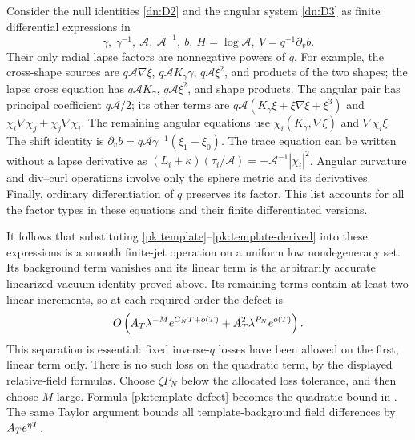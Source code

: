 Consider the null identities \eqref{dn:D2} and the angular system
\eqref{dn:D3} as finite differential expressions in
\[
 \gamma,\ \gamma^{-1},\ \mathcal A,\ \mathcal A^{-1},\ b,
 \ H=\log\mathcal A,\ V=q^{-1}\partial_vb.
\]
Their only radial lapse factors are nonnegative powers of $q$.
For example, the cross-shape sources are
$q\mathcal A\nabla\xi$, $q\mathcal A K_\gamma\gamma$,
$q\mathcal A\xi^2$, and products of the two shapes; the lapse
cross equation has $q\mathcal A K_\gamma$,
$q\mathcal A\xi^2$, and shape products. The angular pair has
principal coefficient $q\mathcal A/2$; its other terms are
$q\mathcal A(K_\gamma\xi+\xi\nabla\xi+\xi^3)$ and
$\chi_i\nabla\chi_j+\chi_j\nabla\chi_i$. The remaining angular
equations use $\chi_i(K_\gamma,\nabla\xi)$ and
$\nabla\chi_i\xi$. The shift identity is
$\partial_vb=q\mathcal A\gamma^{-1}(\xi_1-\xi_0)$.
The trace equation can be written without a lapse derivative as
$(L_i+\kappa)(\tau_i/\mathcal A)=-\mathcal A^{-1}|\chi_i|^2$.
Angular curvature and div--curl operations involve only the sphere
metric and its derivatives. Finally, ordinary differentiation of
$q$ preserves its factor. This list accounts for all the factor
types in these equations and their finite differentiated versions.

It follows that substituting \eqref{pk:template}--\eqref{pk:template-derived}
into these expressions is a smooth finite-jet operation on a
uniform low nondegeneracy set. Its background term vanishes and
its linear term is the arbitrarily accurate linearized vacuum
identity proved above. Its remaining terms contain at least two
linear increments, so at each required order the defect is
\begin{equation}\label{pk:template-defect}
 O\left(A_T\lambda^{-M}e^{C_NT+o(T)}
                   +A_T^2\lambda^{P_N}e^{o(T)}\right).
\end{equation}
This separation is essential: fixed inverse-$q$ losses have been
allowed on the first, linear term only. There is no such loss on
the quadratic term, by the displayed relative-field formulas.
Choose $\zeta P_N$ below the allocated loss tolerance, and then
choose $M$ large. Formula \eqref{pk:template-defect} becomes the
quadratic bound in . The same
Taylor argument bounds all template-background field differences
by $A_T e^{\eta T}$.

